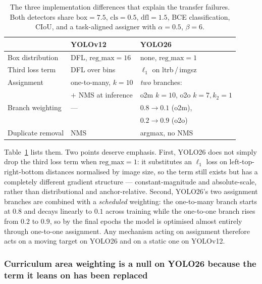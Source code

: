 \documentclass[10pt,twocolumn,a4paper]{article}
\begin{document}
\begin{table}[t]
\centering
\caption{The three implementation differences that explain the transfer
failures. Both detectors share $\mathrm{box}{=}7.5$, $\mathrm{cls}{=}0.5$,
$\mathrm{dfl}{=}1.5$, BCE classification, CIoU, and a task-aligned assigner with
$\alpha{=}0.5$, $\beta{=}6$.}
\label{tab:implsdiff}
\small
\begin{tabular}{@{}lll@{}}
\toprule
& \textbf{YOLOv12} & \textbf{YOLO26} \\
\midrule
Box distribution   & DFL, $\mathrm{reg\_max}{=}16$ & none, $\mathrm{reg\_max}{=}1$ \\
Third loss term    & DFL over bins & $\ell_1$ on ltrb\,/\,imgsz \\
Assignment         & one-to-many, $k{=}10$ & \emph{two} branches: \\
                   & \; $+$ NMS at inference & \; o2m $k{=}10$, o2o $k{=}7,k_2{=}1$ \\
Branch weighting   & --- & $0.8 \rightarrow 0.1$ (o2m), \\
                   &     & $0.2 \rightarrow 0.9$ (o2o) \\
Duplicate removal  & NMS & argmax, no NMS \\
\bottomrule
\end{tabular}
\end{table}

Table~\ref{tab:implsdiff} lists them. Two points deserve emphasis. First, YOLO26
does not simply drop the third loss term when $\mathrm{reg\_max}{=}1$: it
substitutes an $\ell_1$ loss on left-top-right-bottom distances normalised by
image size, so the term still exists but has a completely different gradient
structure --- constant-magnitude and absolute-scale, rather than distributional
and anchor-relative. Second, YOLO26's two assignment branches are combined with a
\emph{scheduled} weighting: the one-to-many branch starts at $0.8$ and decays
linearly to $0.1$ across training while the one-to-one branch rises from $0.2$ to
$0.9$, so by the final epochs the model is optimised almost entirely through
one-to-one assignment. Any mechanism acting on assignment therefore acts on a
moving target on YOLO26 and on a static one on YOLOv12.

\subsubsection{Curriculum area weighting is a null on YOLO26 because the term it
leans on has been replaced}
\end{document}
